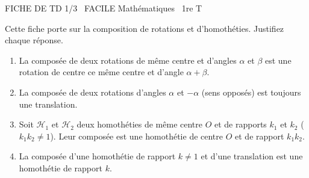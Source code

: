 \documentclass[11pt]{article}
\begin{document}
\begin{tcolorbox}[enhanced,colback=popink,colframe=popink,arc=10pt,boxrule=0pt,left=12pt,right=12pt,top=9pt,bottom=9pt]
{\color{white}\popxbold\small FICHE DE TD 1/3 \textbullet\ FACILE \hfill Mathématiques \textbullet\ 1re T\par}
\end{tcolorbox}
\vspace{4pt}
Cette fiche porte sur la composition de rotations et d'homothéties. Justifiez chaque réponse.

\begin{exercice}
\begin{enumerate}
    \item La composée de deux rotations de même centre et d'angles $\alpha$ et $\beta$ est une rotation de centre ce même centre et d'angle $\alpha+\beta$.
    \item La composée de deux rotations d'angles $\alpha$ et $-\alpha$ (sens opposés) est toujours une translation.
    \item Soit $\mathcal{H}_1$ et $\mathcal{H}_2$ deux homothéties de même centre $O$ et de rapports $k_1$ et $k_2$ ($k_1k_2 \neq 1$). Leur composée est une homothétie de centre $O$ et de rapport $k_1k_2$.
    \item La composée d'une homothétie de rapport $k \neq 1$ et d'une translation est une homothétie de rapport $k$.
\end{enumerate}
\end{exercice}
\end{document}
